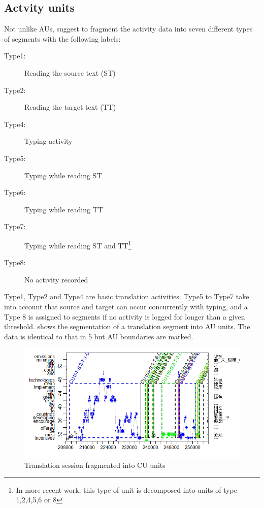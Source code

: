 \documentclass[output=paper]{LSP/langsci}
\begin{document}
\subsection{Actvity units}
\label{carl-schaeffer:sec:3.3}

Not unlike \citet{Hvelplund2016} AUs, \citet{Carl2016CRITT} suggest to fragment the activity data into seven different types of segments with the following labels:

\begin{description}
\item[Type1:] Reading the source text (ST)
\item[Type2:] Reading the target text (TT)
\item[Type4:] Typing activity
\item[Type5:] Typing while reading ST
\item[Type6:] Typing while reading TT
\item[Type7:] Typing while reading ST and TT\footnote{In more recent work, this type of unit is decomposed into units of type 1,2,4,5,6 or 8}
\item[Type8:] No activity recorded
\end{description}

Type1, Type2 and Type4 are basic translation activities. Type5 to Type7 take into account that source and target  can occur concurrently with typing, and a Type 8 is assigned to segments if no activity is logged for longer than a given threshold.  shows the segmentation of a translation segment into AU units. The data is identical to that in  5 but AU boundaries are marked. 

\begin{figure}

\includegraphics[width=\textwidth]{figures/carl-schaefer/sketch-img011.png} 

\caption{Translation session fragmented into CU units}
\label{carl-schaeffer:fig:cuunit}
\end{figure}
\end{document}
